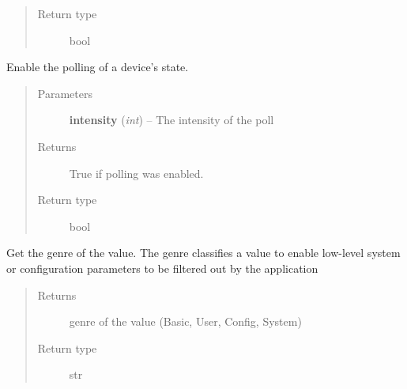 \documentclass[letterpaper,10pt,english]{sphinxmanual}
\begin{document}
\begin{fulllineitems}
\begin{fulllineitems}
\begin{quote}
\begin{description}
\item[{Return type}] \leavevmode
bool

\end{description}\end{quote}

\end{fulllineitems}


\begin{fulllineitems}
\label{value:openzwave.value.ZWaveValue.enable_poll}
Enable the polling of a device's state.
\begin{quote}\begin{description}
\item[{Parameters}] \leavevmode
\textbf{intensity} (\emph{int}) -- The intensity of the poll

\item[{Returns}] \leavevmode
True if polling was enabled.

\item[{Return type}] \leavevmode
bool

\end{description}\end{quote}

\end{fulllineitems}


\begin{fulllineitems}
\label{value:openzwave.value.ZWaveValue.genre}
Get the genre of the value.  The genre classifies a value to enable
low-level system or configuration parameters to be filtered out
by the application
\begin{quote}\begin{description}
\item[{Returns}] \leavevmode
genre of the value (Basic, User, Config, System)

\item[{Return type}] \leavevmode
str

\end{description}\end{quote}

\end{fulllineitems}



\end{fulllineitems}
\end{document}
